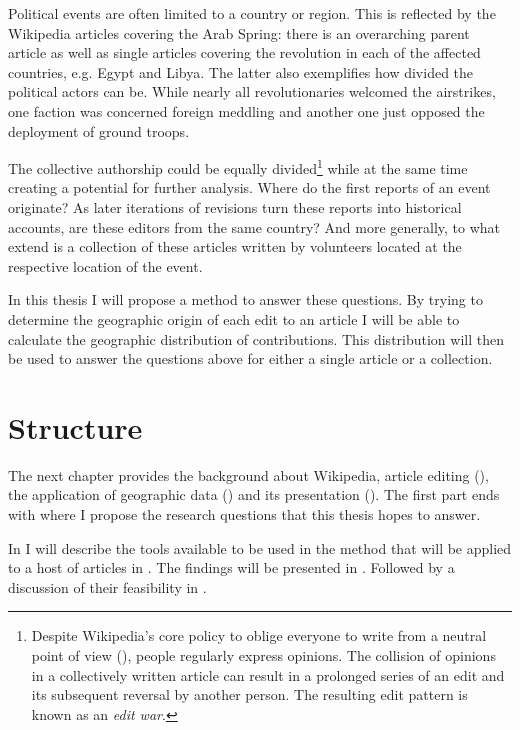 Political events are often limited to a country or region. 
This is reflected by the Wikipedia articles covering the Arab Spring: there is an overarching parent article as well as single articles covering the revolution in each of the affected countries, e.g. Egypt and Libya.
The latter also exemplifies how divided the political actors can be.
While nearly all revolutionaries welcomed the airstrikes, one faction was concerned foreign meddling and another one just opposed the deployment of ground troops.\cite{econ18290470}

The collective authorship could be equally divided\footnote{Despite Wikipedia's core policy to oblige everyone to write from a neutral point of view (), people regularly express opinions. The collision of opinions in a collectively written article can result in a prolonged series of an edit and its subsequent reversal by another person. The resulting edit pattern is known as an \emph{edit war}.\cite{suh2007us}} while at the same time creating a potential for further analysis.
Where do the first reports of an event originate?
As later iterations of revisions turn these reports into historical accounts, are these editors from the same country?
And more generally, to what extend is a collection of these articles written by volunteers located at the respective location of the event.

In this thesis I will propose a method to answer these questions.
By trying to determine the geographic origin of each edit to an article I will be able to calculate the geographic distribution of contributions.
This distribution will then be used to answer the questions above for either a single article or a collection.


\section{Structure}


The next chapter  provides the background about Wikipedia, article editing (), the application of geographic data () and its presentation ().
The first part ends with  where I propose the research questions that this thesis hopes to answer.

In  I will describe the tools available to be used in the method that will be applied to a host of articles in .
The findings will be presented in .
Followed by a discussion of their feasibility in .